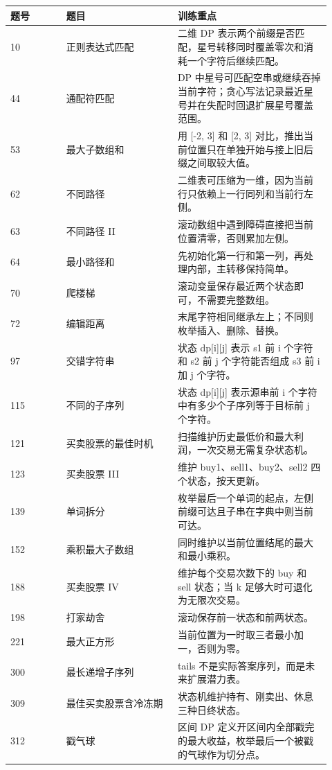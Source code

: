 \begin{longtable}{@{}p{0.16\linewidth}p{0.32\linewidth}p{0.44\linewidth}@{}}
\toprule
题号 & 题目 & 训练重点\\
\midrule
\endhead
10 & 正则表达式匹配 & 二维 DP 表示两个前缀是否匹配，星号转移同时覆盖零次和消耗一个字符后继续匹配。\\
44 & 通配符匹配 & DP 中星号可匹配空串或继续吞掉当前字符；贪心写法记录最近星号并在失配时回退扩展星号覆盖范围。\\
53 & 最大子数组和 & 用 [-2, 3] 和 [2, 3] 对比，推出当前位置只在单独开始与接上旧后缀之间取较大值。\\
62 & 不同路径 & 二维表可压缩为一维，因为当前行只依赖上一行同列和当前行左侧。\\
63 & 不同路径 II & 滚动数组中遇到障碍直接把当前位置清零，否则累加左侧。\\
64 & 最小路径和 & 先初始化第一行和第一列，再处理内部，主转移保持简单。\\
70 & 爬楼梯 & 滚动变量保存最近两个状态即可，不需要完整数组。\\
72 & 编辑距离 & 末尾字符相同继承左上；不同则枚举插入、删除、替换。\\
97 & 交错字符串 & 状态 dp[i][j] 表示 s1 前 i 个字符和 s2 前 j 个字符能否组成 s3 前 i 加 j 个字符。\\
115 & 不同的子序列 & 状态 dp[i][j] 表示源串前 i 个字符中有多少个子序列等于目标前 j 个字符。\\
121 & 买卖股票的最佳时机 & 扫描维护历史最低价和最大利润，一次交易无需复杂状态机。\\
123 & 买卖股票 III & 维护 buy1、sell1、buy2、sell2 四个状态，按天更新。\\
139 & 单词拆分 & 枚举最后一个单词的起点，左侧前缀可达且子串在字典中则当前可达。\\
152 & 乘积最大子数组 & 同时维护以当前位置结尾的最大和最小乘积。\\
188 & 买卖股票 IV & 维护每个交易次数下的 buy 和 sell 状态；当 k 足够大时可退化为无限次交易。\\
198 & 打家劫舍 & 滚动保存前一状态和前两状态。\\
221 & 最大正方形 & 当前位置为一时取三者最小加一，否则为零。\\
300 & 最长递增子序列 & tails 不是实际答案序列，而是未来扩展潜力表。\\
309 & 最佳买卖股票含冷冻期 & 状态机维护持有、刚卖出、休息三种日终状态。\\
312 & 戳气球 & 区间 DP 定义开区间内全部戳完的最大收益，枚举最后一个被戳的气球作为切分点。\\

\end{longtable}
